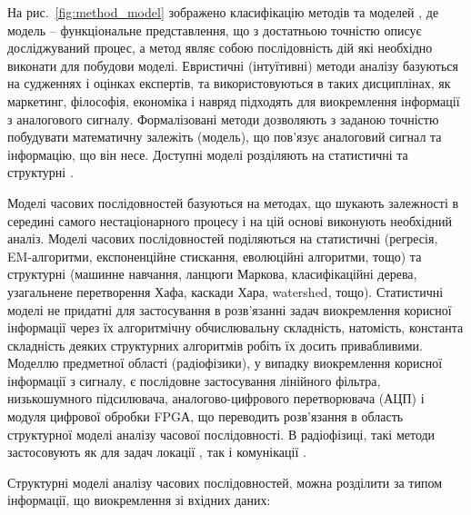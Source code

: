На рис.~\ref{fig:method_model} зображено класифікацію методів та моделей 
\cite{imp:Chuchueva2012}, де модель -- функціональне представлення, що з 
достатньою точністю описує досліджуваний процес, а метод являє собою 
послідовність дій які необхідно виконати для побудови моделі. Евристичні 
(інтуїтивні) методи аналізу базуються на судженнях і оцінках експертів, 
та використовуються в таких дисциплінах, як маркетинг, філософія, економіка 
і навряд підходять для виокремлення інформації з аналогового 
сигналу. Формалізовані методи дозволяють з заданою точністю побудувати 
математичну залежіть (модель), що пов'язує аналоговий сигнал та інформацію, 
що він несе. Доступні моделі розділяють на статистичні та структурні 
\cite{imp:Chuchueva2012}.

Моделі часових послідовностей базуються на методах, що шукають залежності
в середині самого нестаціонарного процесу і на цій основі виконують 
необхідний аналіз. Моделі часових послідовностей поділяються на статистичні
(регресія, EM-алгоритми, експоненційне стискання, еволюційні алгоритми, тощо)
та структурні (машинне навчання, ланцюги Маркова, класифікаційні дерева, 
узагальнене перетворення Хафа, каскади Хара, watershed, тощо). Статистичні 
моделі не придатні для застосування в розв'язанні задач виокремлення корисної 
інформації через їх алгоритмічну обчислювальну складність, натомість, 
константа складність деяких структурних алгоритмів робіть їх досить 
привабливими. Моделлю предметної області (радіофізики), у випадку виокремлення 
корисної інформації з сигналу, є послідовне застосування лінійного фільтра, 
низькошумного підсилювача, аналогово-цифрового перетворювача (АЦП) і модуля 
цифрової обробки FPGА, що переводить розв'язання в область структурної моделі
аналізу часової послідовності. В радіофізиці, такі методи застосовують як 
для задач локації \cite{imp:Dumin2017}, так і комунікації \cite{imp:Taok2009}.

Структурні моделі аналізу часових послідовностей, можна розділити за типом
інформації, що виокремлення зі вхідних даних:

